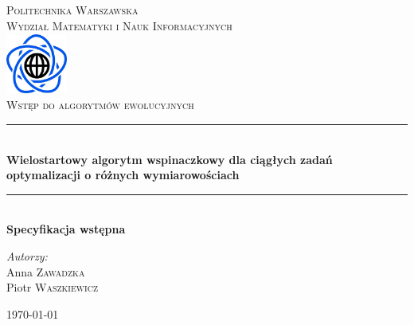 \documentclass{article}
\begin{document}
	
	
	\begin{titlepage}
		
		\newcommand{\HRule}{\rule{\linewidth}{0.5mm}}
		
		\begin{center}
			
			\textsc{\LARGE Politechnika Warszawska}\\[0.5cm]
			\textsc{\Large Wydział Matematyki i Nauk Informacyjnych}\\[1cm]
			
			\includegraphics[width=2cm, height=2cm]{logo}\\[1cm]
			
			
			\textsc{\Huge Wstęp do algorytmów ewolucyjnych}\\[0.5cm]
			
			
			\HRule \\[0.4cm]
			{ \LARGE \bfseries Wielostartowy algorytm wspinaczkowy dla ciągłych zadań optymalizacji o różnych wymiarowościach}\\[0.2cm]
			
			
			\HRule \\[0.4cm]
			{  \bfseries Specyfikacja wstępna}\\[2.5cm]
			
			\begin{flushright}
				\Large \emph{Autorzy:}\\[0.5cm]
				Anna \textsc{Zawadzka}\\
				Piotr \textsc{Waszkiewicz}\\[1.5cm]
			\end{flushright} 
			
			\vfill
			{\large \today}\\[1cm]
			
		\end{center}
		
	\end{titlepage}
	
\end{document}
